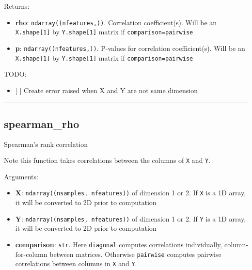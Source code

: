 Returns:

\begin{itemize}
\tightlist
\item
  \textbf{rho}: \texttt{ndarray((nfeatures,))}. Correlation
  coefficient(s). Will be an \texttt{X.shape{[}1{]}} by
  \texttt{Y.shape{[}1{]}} matrix if
  \texttt{comparison=\textquotesingle{}pairwise\textquotesingle{}}
\item
  \textbf{p}: \texttt{ndarray((nfeatures,))}. P-values for correlation
  coefficient(s). Will be an \texttt{X.shape{[}1{]}} by
  \texttt{Y.shape{[}1{]}} matrix if
  \texttt{comparison=\textquotesingle{}pairwise\textquotesingle{}}
\end{itemize}

TODO:

\begin{itemize}
\tightlist
\item
  {[} {]} Create error raised when X and Y are not same dimension
\end{itemize}

\begin{center}\rule{0.5\linewidth}{\linethickness}\end{center}

\subsection{spearman\_rho}\label{spearman_rho}

\begin{Shaded}
\begin{Highlighting}[]
\OperatorTok{=}\NormalTok{)}
\end{Highlighting}
\end{Shaded}

Spearman's rank correlation

Note this function takes correlations between the columns of \texttt{X}
and \texttt{Y}.

Arguments:

\begin{itemize}
\tightlist
\item
  \textbf{X}: \texttt{ndarray((nsamples,\ nfeatures))} of dimension 1 or
  2. If \texttt{X} is a 1D array, it will be converted to 2D prior to
  computation
\item
  \textbf{Y}: \texttt{ndarray((nsamples,\ nfeatures))} of dimension 1 or
  2. If \texttt{Y} is a 1D array, it will be converted to 2D prior to
  computation
\item
  \textbf{comparison}: \texttt{str}. Here
  \texttt{\textquotesingle{}diagonal\textquotesingle{}} computes
  correlations individually, column-for-column between matrices.
  Otherwise \texttt{\textquotesingle{}pairwise\textquotesingle{}}
  computes pairwise correlations between columns in \texttt{X} and
  \texttt{Y}.
\end{itemize}

